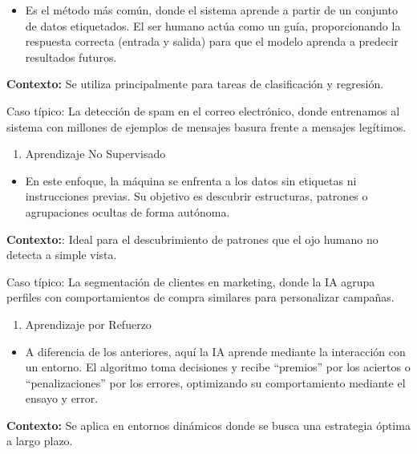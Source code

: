 \documentclass[
  spanish,
  letterpaper,
  DIV=11,
  numbers=noendperiod,
  oneside]{scrreprt}
\providecommand{\tightlist}{%
  \setlength{\itemsep}{0pt}\setlength{\parskip}{0pt}}
\begin{document}
\begin{itemize}
\tightlist
\item
  Es el método más común, donde el sistema aprende a partir de un
  conjunto de datos etiquetados. El ser humano actúa como un guía,
  proporcionando la respuesta correcta (entrada y salida) para que el
  modelo aprenda a predecir resultados futuros.
\end{itemize}

\textbf{Contexto:} Se utiliza principalmente para tareas de
clasificación y regresión.

Caso típico: La detección de spam en el correo electrónico, donde
entrenamos al sistema con millones de ejemplos de mensajes basura frente
a mensajes legítimos.

\begin{enumerate}
\def\labelenumi{\arabic{enumi}.}
\setcounter{enumi}{1}
\tightlist
\item
  Aprendizaje No Supervisado
\end{enumerate}

\begin{itemize}
\tightlist
\item
  En este enfoque, la máquina se enfrenta a los datos sin etiquetas ni
  instrucciones previas. Su objetivo es descubrir estructuras, patrones
  o agrupaciones ocultas de forma autónoma.
\end{itemize}

\textbf{Contexto:}: Ideal para el descubrimiento de patrones que el ojo
humano no detecta a simple vista.

Caso típico: La segmentación de clientes en marketing, donde la IA
agrupa perfiles con comportamientos de compra similares para
personalizar campañas.

\begin{enumerate}
\def\labelenumi{\arabic{enumi}.}
\setcounter{enumi}{2}
\tightlist
\item
  Aprendizaje por Refuerzo
\end{enumerate}

\begin{itemize}
\tightlist
\item
  A diferencia de los anteriores, aquí la IA aprende mediante la
  interacción con un entorno. El algoritmo toma decisiones y recibe
  ``premios'' por los aciertos o ``penalizaciones'' por los errores,
  optimizando su comportamiento mediante el ensayo y error.
\end{itemize}

\textbf{Contexto:} Se aplica en entornos dinámicos donde se busca una
estrategia óptima a largo plazo.
\end{document}
